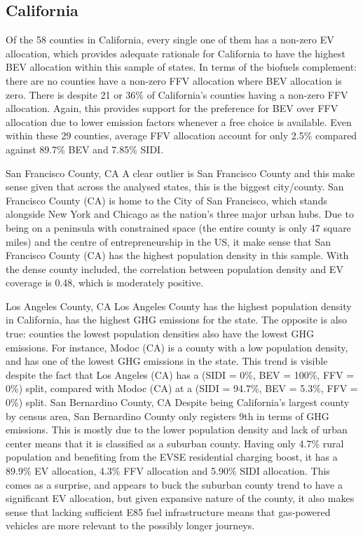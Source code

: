 \documentclass[answers]{exam}
\begin{document}
\subsection{California}
Of the 58 counties in California, every single one of them has a non-zero EV allocation, which provides adequate rationale for California to have the highest BEV allocation within this sample of states. In terms of the biofuels complement: there are no counties have a non-zero FFV allocation where BEV allocation is zero. There is despite 21 or 36\% of California's counties having a non-zero FFV allocation. Again, this provides support for the preference for BEV over FFV allocation due to lower emission factors whenever a free choice is available. Even within these 29 counties, average FFV allocation account for only 2.5\% compared against 89.7\% BEV and 7.85\% SIDI.
\begin{outline}
\1 San Francisco County, CA
\2 A clear outlier is San Francisco County and this make sense given that across the analysed states, this is the biggest city/county. San Francisco County (CA) is home to the City of San Francisco, which stands alongside New York and Chicago as the nation's three major urban hubs. Due to being on a peninsula with constrained space (the entire county is only 47 square miles) and the centre of entrepreneurship in the US, it make sense that San Francisco County (CA) has the highest population density in this sample. With the dense county included, the correlation between population density and EV coverage is 0.48, which is moderately positive.

\1 Los Angeles County, CA
\2 Los Angeles County has the highest population density in California, has the highest GHG emissions for the state. The opposite is also true: counties the lowest population densities also have the lowest GHG emissions. For instance, Modoc (CA) is a county with a low population density, and has one of the lowest GHG emissions in the state. This trend is visible despite the fact that Los Angeles (CA) has a (SIDI = 0\%, BEV = 100\%, FFV = 0\%) split, compared with Modoc (CA) at a (SIDI = 94.7\%, BEV = 5.3\%, FFV = 0\%) split.
\1 San Bernardino County, CA
\2 	Despite being California's largest county by census area, San Bernardino County only registers 9th in terms of GHG emissions. This is mostly due to the lower population density and lack of urban center means that it is classified as a suburban county. Having only 4.7\% rural population and benefiting from the EVSE residential charging boost, it has a 89.9\% EV allocation, 4.3\% FFV allocation and 5.90\% SIDI allocation. This comes as a surprise, and appears to buck the suburban county trend to have a significant EV allocation, but given expansive nature of the county, it also makes sense that lacking sufficient E85 fuel infrastructure means that gas-powered vehicles are more relevant to the possibly longer journeys.  
\end{outline}
\newpage
\newpage
\end{document}

